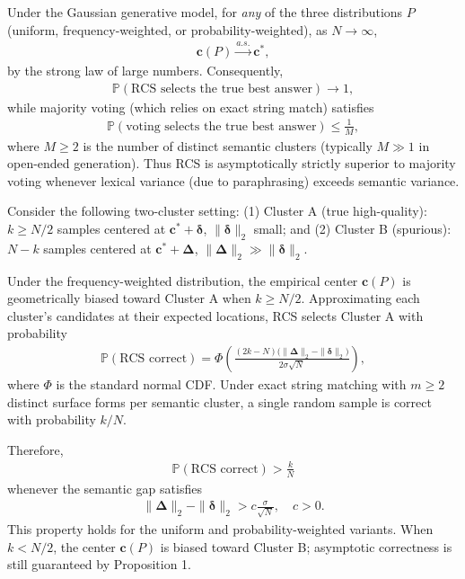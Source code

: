 \begin{prop}
Under the Gaussian generative model, for \emph{any} of the three distributions \(P\) (uniform, frequency-weighted, or probability-weighted), as \(N \to \infty\),
\begin{align}
\mathbf{c}(P) \xrightarrow{a.s.} \mathbf{c}^*,
\end{align}
by the strong law of large numbers. Consequently,
\begin{align}
\mathbb{P}(\text{RCS selects the true best answer}) \to 1,
\end{align}
while majority voting (which relies on exact string match) satisfies
\begin{align}
\mathbb{P}(\text{voting selects the true best answer}) \leq \frac{1}{M},
\end{align}
where \(M \geq 2\) is the number of distinct semantic clusters (typically \(M \gg 1\) in open-ended generation). Thus RCS is asymptotically strictly superior to majority voting whenever lexical variance (due to paraphrasing) exceeds semantic variance.
\end{prop}

\begin{prop}
Consider the following two-cluster setting: (1) Cluster A (true high-quality): \(k \geq N/2\) samples centered at \(\mathbf{c}^* + \boldsymbol{\delta}\), \(\|\boldsymbol{\delta}\|_2\) small; and (2) Cluster B (spurious): \(N-k\) samples centered at \(\mathbf{c}^* + \boldsymbol{\Delta}\), \(\|\boldsymbol{\Delta}\|_2 \gg \|\boldsymbol{\delta}\|_2\).

Under the frequency-weighted distribution, the empirical center \(\mathbf{c}(P)\) is geometrically biased toward Cluster A when \(k \geq N/2\). Approximating each cluster's candidates at their expected locations, RCS selects Cluster A with probability
\begin{align}
\mathbb{P}(\text{RCS correct})
= \Phi\left( \frac{(2k-N)\bigl(\|\boldsymbol{\Delta}\|_2 - \|\boldsymbol{\delta}\|_2\bigr)}{2\sigma\sqrt{N}} \right),
\end{align}
where \(\Phi\) is the standard normal CDF. Under exact string matching with \(m \geq 2\) distinct surface forms per semantic cluster, a single random sample is correct with probability \(k/N\).

Therefore,
\begin{align}
\mathbb{P}(\text{RCS correct}) > \frac{k}{N}
\end{align}
whenever the semantic gap satisfies
\begin{align}
\|\boldsymbol{\Delta}\|_2 - \|\boldsymbol{\delta}\|_2 > c\frac{\sigma}{\sqrt{N}}, \quad c > 0.
\end{align}
This property holds for the uniform and probability-weighted variants. When \(k < N/2\), the center \(\mathbf{c}(P)\) is biased toward Cluster B; asymptotic correctness is still guaranteed by Proposition 1.
\end{prop}

